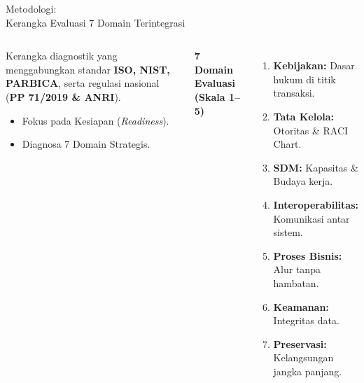 \documentclass[aspectratio=169,11pt]{beamer}
\begin{document}
\begin{frame}{Metodologi: \\ Kerangka Evaluasi 7 Domain Terintegrasi}
    \begin{columns}
        \begin{premiumbox}
            \small
            Kerangka diagnostik yang menggabungkan standar \textbf{ISO, NIST, PARBICA}, serta regulasi nasional (\textbf{PP 71/2019 \& ANRI}).
            \begin{itemize}
                \item Fokus pada Kesiapan (\textit{Readiness}).
                \item Diagnosa 7 Domain Strategis.
            \end{itemize}
        \end{premiumbox}
        
        \textbf{7 Domain Evaluasi (Skala 1--5)}
        \vspace{0.2cm}
        \tiny
        \begin{enumerate}
            \item \textbf{Kebijakan:} Dasar hukum di titik transaksi.
            \item \textbf{Tata Kelola:} Otoritas \& RACI Chart.
            \item \textbf{SDM:} Kapasitas \& Budaya kerja.
            \item \textbf{Interoperabilitas:} Komunikasi antar sistem.
            \item \textbf{Proses Bisnis:} Alur tanpa hambatan.
            \item \textbf{Keamanan:} Integritas data.
            \item \textbf{Preservasi:} Kelangsungan jangka panjang.
        \end{enumerate}
    \end{columns}
\end{frame}
\end{document}
